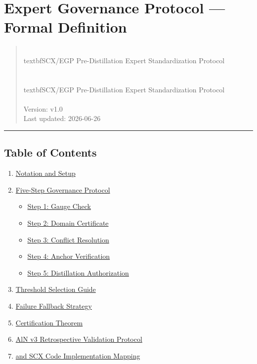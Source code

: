 \documentclass[
  12pt,
]{article}
\author{SCX}
\date{2026}
\providecommand{\tightlist}{%
  \setlength{\itemsep}{0pt}\setlength{\parskip}{0pt}}
\begin{document}
\section{Expert Governance Protocol ---
Formal Definition}\label{expert-governance-protocol-formal-definition}

\begin{quote}
\\textbf{SCX/EGP Pre-Distillation Expert Standardization Protocol}\\\\
\\textbf{SCX/EGP Pre-Distillation Expert Standardization Protocol}\\\\
Version: v1.0\\
Last updated: 2026-06-26
\end{quote}

\begin{center}\rule{0.5\linewidth}{0.5pt}\end{center}

\subsection{Table of Contents}\label{ux76eeux5f55}

\begin{enumerate}
\def\labelenumi{\arabic{enumi}.}
\tightlist
\item
  \hyperref[1-ux7b26ux53f7ux4e0eux8bbeux5b9a]{Notation and Setup}
\item
  \hyperref[2-ux4e94ux6b65-governance-protocol]{Five-Step Governance
  Protocol}

  \begin{itemize}
  \tightlist
  \item
    \hyperref[step-1-gauge-check-]{Step 1: Gauge Check}
  \item
    \hyperref[step-2-domain-certificate-]{Step 2: Domain Certificate}
  \item
    \hyperref[step-3-conflict-resolution-]{Step 3: Conflict Resolution}
  \item
    \hyperref[step-4-anchor-verification-]{Step 4: Anchor Verification}
  \item
    \hyperref[step-5-distillation-authorization-]{Step 5: Distillation
    Authorization}
  \end{itemize}
\item
  \hyperref[3-ux9608ux503cux9009ux62e9ux6307ux5f15]{Threshold Selection Guide}
\item
  \hyperref[4-ux5931ux8d25ux56deux9000ux7b56ux7565]{Failure Fallback Strategy}
\item
  \hyperref[5-certification-theorem]{Certification Theorem}
\item
  \hyperref[6-aln-v3-ux56deux987eux6027ux9a8cux8bc1ux65b9ux6848]{AlN v3
  Retrospective Validation Protocol}
\item
  \hyperref[7-ux4e0e-scx-ux4ee3ux7801ux7684ux5b9eux73b0ux6620ux5c04]{and
  SCX Code Implementation Mapping}
\end{enumerate}
\end{document}
